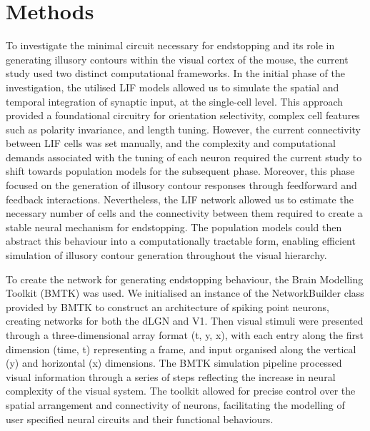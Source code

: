 \documentclass[12pt]{article}
\begin{document}
\section*{Methods}
To investigate the minimal circuit necessary for endstopping and its role in generating illusory contours within the visual cortex of the mouse, the current study used two distinct computational frameworks. In the initial phase of the investigation, the utilised LIF models allowed us to simulate the spatial and temporal integration of synaptic input, at the single-cell level. This approach provided a foundational circuitry for orientation selectivity, complex cell features such as polarity invariance, and length tuning. However, the current connectivity between LIF cells was set manually, and the complexity and computational demands associated with the tuning of each neuron required the current study to shift towards population models for the subsequent phase. Moreover, this phase focused on the generation of illusory contour responses through feedforward and feedback interactions. Nevertheless, the LIF network allowed us to estimate the necessary number of cells and the connectivity between them required to create a stable neural mechanism for endstopping. The population models could then abstract this behaviour into a computationally tractable form, enabling efficient simulation of illusory contour generation throughout the visual hierarchy. 


To create the network for generating endstopping behaviour, the Brain Modelling Toolkit (BMTK) was used. We initialised an instance of the NetworkBuilder class provided by BMTK to construct an architecture of spiking point neurons, creating networks for both the dLGN and V1. Then visual stimuli were presented through a three-dimensional array format (t, y, x), with each entry along the first dimension (time, t) representing a frame, and input organised along the vertical (y) and horizontal (x) dimensions. The BMTK simulation pipeline processed visual information through a series of steps reflecting the increase in neural complexity of the visual system. The toolkit allowed for precise control over the spatial arrangement and connectivity of neurons, facilitating the modelling of user specified neural circuits and their functional behaviours.
\end{document}
